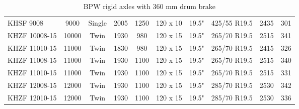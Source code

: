 \begin{table}[H]
\begin{threeparttable}
\begin{tabulary}{\textwidth}{lccccccccc}
    KHSF 9008 & 9000  & Single & 2005  & 1250  & 120 x 10 & 19.5" & 425/55 R19.5 & 2435  & 301 \\
    KHZF 10008-15 & 10000 & Twin  & 1930  & 980   & 120 x 15 & 19.5" & 265/70 R19.5 & 2515  & 341 \\
    KHZF 11010-15 & 11000 & Twin  & 1830  & 980   & 120 x 15 & 19.5" & 265/70 R19.5 & 2415  & 326 \\
    KHZF 11008-15 & 11000 & Twin  & 1930  & 1100  & 120 x 15 & 19.5" & 265/70 R19.5 & 2515  & 340 \\
    KHZF 11010-15 & 11000 & Twin  & 1930  & 1100  & 120 x 15 & 19.5" & 265/70 R19.5 & 2515  & 331 \\
    KHZF 12008-15 & 12000 & Twin  & 1930  & 1100  & 120 x 15 & 19.5" & 285/70 R19.5 & 2530  & 342 \\
    KHZF 12010-15 & 12000 & Twin  & 1930  & 1100  & 120 x 15 & 19.5" & 285/70 R19.5 & 2530  & 336 \\
	\bottomrule
	\end{tabulary}

	\caption{BPW rigid axles with 360 mm drum brake}
	\label{table:bpw-rigid-axles-with-360-mm-drum-brake}


	\end{threeparttable}
\end{table}

